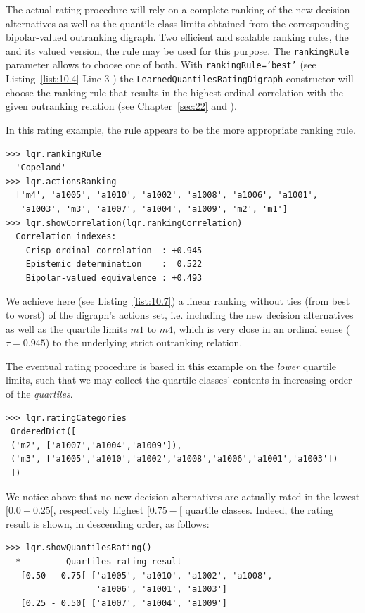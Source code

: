 The actual rating procedure will rely on a complete ranking of the new decision alternatives as well as the quantile class limits obtained from the corresponding bipolar-valued outranking digraph. Two efficient and scalable ranking rules, the \Copeland and its valued version, the \NetFlows rule may be used for this purpose. The \texttt{rankingRule} parameter allows to choose one of both. With \texttt{rankingRule='best'} (see Listing~\ref{list:10.4} Line 3 ) the \texttt{LearnedQuantilesRatingDigraph} constructor will choose the ranking rule that results in the highest ordinal correlation with the given outranking relation (see Chapter~\ref{sec:22} and \citep{BIS-2012a}).

In this rating example, the \Copeland rule appears to be the more appropriate ranking rule.
\begin{lstlisting}[caption={\Copeland ranking of new alternatives and historical quartile limits},label=list:10.7]
>>> lqr.rankingRule
  'Copeland'
>>> lqr.actionsRanking
  ['m4', 'a1005', 'a1010', 'a1002', 'a1008', 'a1006', 'a1001',
   'a1003', 'm3', 'a1007', 'a1004', 'a1009', 'm2', 'm1'] 
>>> lqr.showCorrelation(lqr.rankingCorrelation)
  Correlation indexes:
    Crisp ordinal correlation  : +0.945
    Epistemic determination    :  0.522
    Bipolar-valued equivalence : +0.493
\end{lstlisting}
We achieve here (see Listing~\ref{list:10.7}) a linear ranking without ties (from best to worst) of the digraph's actions set, i.e. including the new decision alternatives as well as the quartile limits $m1$ to $m4$, which is very close in an ordinal sense ($\tau = 0.945$) to the underlying strict outranking relation.

The eventual rating procedure is based in this example on the \emph{lower} quartile limits, such that we may collect the quartile classes' contents in increasing order of the \emph{quartiles}.
\begin{lstlisting}
>>> lqr.ratingCategories
 OrderedDict([
 ('m2', ['a1007','a1004','a1009']),
 ('m3', ['a1005','a1010','a1002','a1008','a1006','a1001','a1003'])
 ])
\end{lstlisting}    
We notice above that no new decision alternatives are actually rated in the lowest $[0.0-0.25[$, respectively highest $[0.75- [$ quartile classes. Indeed, the rating result is shown, in descending order, as follows:
\begin{lstlisting}[caption={Absolute quartiles rating result},label=list:10.8]
>>> lqr.showQuantilesRating()
  *-------- Quartiles rating result ---------
   [0.50 - 0.75[ ['a1005', 'a1010', 'a1002', 'a1008',
                  'a1006', 'a1001', 'a1003']
   [0.25 - 0.50[ ['a1007', 'a1004', 'a1009']
\end{lstlisting}    

